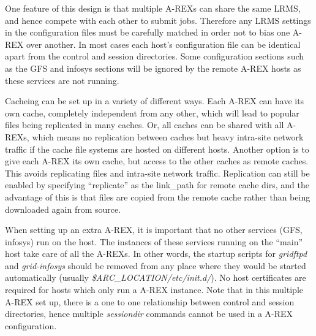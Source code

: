 \documentclass{article}
\begin{document}
One feature of this design is that multiple A-REXs can share the same
LRMS, and hence compete with each other to submit jobs. Therefore any
LRMS settings in the configuration files must be carefully matched in
order not to bias one A-REX over another. In most cases each host's
configuration file can be identical apart from the control and session
directories. Some configuration sections such as the GFS and infosys
sections will be ignored by the remote A-REX hosts as these services are
not running.

Cacheing can be set up in a variety of different ways. Each A-REX can
have its own cache, completely independent from any other, which will
lead to popular files being replicated in many caches. Or, all caches
can be shared with all A-REXs, which means no replication between
caches but heavy intra-site network traffic if the cache file systems
are hosted on different hosts. Another option is to give each A-REX
its own cache, but access to the other caches as remote caches. This
avoids replicating files and intra-site network traffic. Replication
can still be enabled by specifying ``replicate'' as the link\_path for
remote cache dirs, and the advantage of this is that files are copied
from the remote cache rather than being downloaded again from source.

When setting up an extra A-REX, it is important that no other services
(GFS, infosys) run on the host. The instances of these services
running on the ``main'' host take care of all the A-REXs. In other
words, the startup scripts for \emph{gridftpd} and \emph{grid-infosys}
should be removed from any place where they would be started
automatically (usually \emph{\$ARC\_LOCATION/etc/init.d/}). No host
certificates are required for hosts which only run a A-REX
instance. Note that in this multiple A-REX set up, there is a one to
one relationship between control and session directories, hence
multiple \emph{sessiondir} commands cannot be used in a A-REX
configuration.



\end{document}
